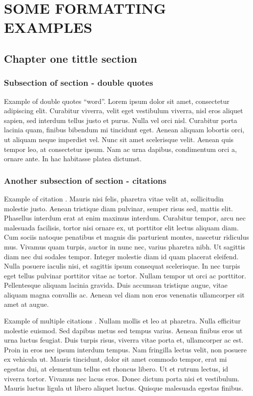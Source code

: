 \addchapheadtotoc
\chapter{SOME FORMATTING EXAMPLES}
\section{Chapter one tittle section}
\subsection{Subsection of section - double quotes}
Example of double quotes ``word''. Lorem ipsum dolor sit amet, consectetur adipiscing elit. Curabitur viverra, velit eget vestibulum viverra, nisl eros aliquet sapien, sed interdum tellus justo et purus. Nulla vel orci nisl. Curabitur porta lacinia quam, finibus bibendum mi tincidunt eget. Aenean aliquam lobortis orci, ut aliquam neque imperdiet vel. Nunc sit amet scelerisque velit. Aenean quis tempor leo, at consectetur ipsum. Nam ac urna dapibus, condimentum orci a, ornare ante. In hac habitasse platea dictumst. 
\subsection{Another subsection of section - citations}
Example of citation \citep{altschul1997gapped}. Mauris nisi felis, pharetra vitae velit at, sollicitudin molestie justo. Aenean tristique diam pulvinar, semper risus sed, mattis elit. Phasellus interdum erat at enim maximus interdum. Curabitur tempor, arcu nec malesuada facilisis, tortor nisi ornare ex, ut porttitor elit lectus aliquam diam. Cum sociis natoque penatibus et magnis dis parturient montes, nascetur ridiculus mus. Vivamus quam turpis, auctor in nunc nec, varius pharetra nibh. Ut sagittis diam nec dui sodales tempor. Integer molestie diam id quam placerat eleifend. Nulla posuere iaculis nisi, et sagittis ipsum consequat scelerisque. In nec turpis eget tellus pulvinar porttitor vitae ac tortor. Nullam tempor ut orci ac porttitor. Pellentesque aliquam lacinia gravida. Duis accumsan tristique augue, vitae aliquam magna convallis ac. Aenean vel diam non eros venenatis ullamcorper sit amet at augue. 


Example of multiple citations \citep{altschul1997gapped,baker2007novel}. Nullam mollis et leo at pharetra. Nulla efficitur molestie euismod. Sed dapibus metus sed tempus varius. Aenean finibus eros ut urna luctus feugiat. Duis turpis risus, viverra vitae porta et, ullamcorper ac est. Proin in eros nec ipsum interdum tempus. Nam fringilla lectus velit, non posuere ex vehicula ut. Mauris tincidunt, dolor sit amet commodo tempor, erat mi egestas dui, at elementum tellus est rhoncus libero. Ut et rutrum lectus, id viverra tortor. Vivamus nec lacus eros. Donec dictum porta nisi et vestibulum. Mauris luctus ligula ut libero aliquet luctus. Quisque malesuada egestas finibus. 
